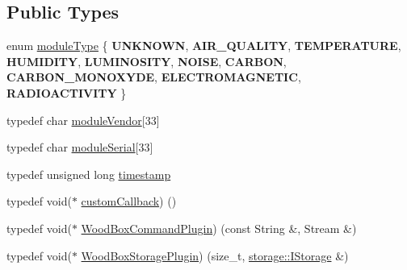 \subsection*{Public Types}
\begin{DoxyCompactItemize}
\item 
enum \mbox{\hyperlink{classwood_box_1_1module_1_1_wood_box_module_af74476c8a785de7fe587c4fb68435673}{module\+Type}} \{ \newline
{\bfseries U\+N\+K\+N\+O\+WN}, 
{\bfseries A\+I\+R\+\_\+\+Q\+U\+A\+L\+I\+TY}, 
{\bfseries T\+E\+M\+P\+E\+R\+A\+T\+U\+RE}, 
{\bfseries H\+U\+M\+I\+D\+I\+TY}, 
\newline
{\bfseries L\+U\+M\+I\+N\+O\+S\+I\+TY}, 
{\bfseries N\+O\+I\+SE}, 
{\bfseries C\+A\+R\+B\+ON}, 
{\bfseries C\+A\+R\+B\+O\+N\+\_\+\+M\+O\+N\+O\+X\+Y\+DE}, 
\newline
{\bfseries E\+L\+E\+C\+T\+R\+O\+M\+A\+G\+N\+E\+T\+IC}, 
{\bfseries R\+A\+D\+I\+O\+A\+C\+T\+I\+V\+I\+TY}
 \}
\item 
typedef char \mbox{\hyperlink{classwood_box_1_1module_1_1_wood_box_module_adf5d59bae2980ff138284d0fa885df19}{module\+Vendor}}\mbox{[}33\mbox{]}
\item 
typedef char \mbox{\hyperlink{classwood_box_1_1module_1_1_wood_box_module_a3a6503bbd5147a06ba50081f97177b46}{module\+Serial}}\mbox{[}33\mbox{]}
\item 
typedef unsigned long \mbox{\hyperlink{classwood_box_1_1module_1_1_wood_box_module_ab03bf835ec02656605c3c0df0188dc28}{timestamp}}
\item 
typedef void($\ast$ \mbox{\hyperlink{classwood_box_1_1module_1_1_wood_box_module_ab6d400f05cc572fb9fd28dd0baf6d346}{custom\+Callback}}) ()
\item 
typedef void($\ast$ \mbox{\hyperlink{classwood_box_1_1module_1_1_wood_box_module_ab0e08bb82f5585fd357ce1881855d0e2}{Wood\+Box\+Command\+Plugin}}) (const String \&, Stream \&)
\item 
typedef void($\ast$ \mbox{\hyperlink{classwood_box_1_1module_1_1_wood_box_module_ac7fea0a06e9fcab2ffb63500f6cd6565}{Wood\+Box\+Storage\+Plugin}}) (size\+\_\+t, \mbox{\hyperlink{classwood_box_1_1storage_1_1_i_storage}{storage\+::\+I\+Storage}} \&)
\end{DoxyCompactItemize}
